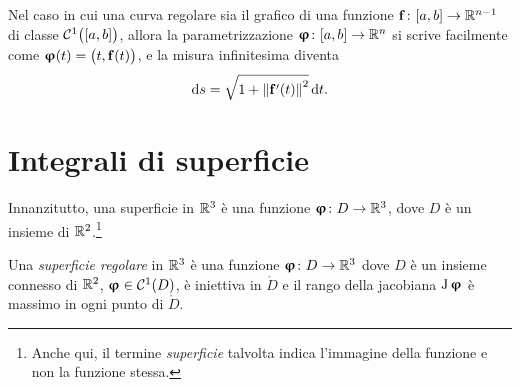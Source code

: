 Nel caso in cui una curva regolare sia il grafico di una funzione $\mathbf{f}\colon[a,b]\to\mathbb{R}^{n-1}$ di classe $\mathcal{C}^{{1}}\big([a,b]\big)$, allora la parametrizzazione $\bm{\upvarphi}\colon[a,b]\to\mathbb{R}^n$ si scrive facilmente come $\bm{\upvarphi}(t)=\big(t,\mathbf{f}(t)\big)$, e la misura infinitesima diventa
\begin{equation}
	\textup{d} s=\sqrt{1+\left\|{\mathbf{f}'(t)}\right\|^2}\,\textup{d} t.
\end{equation}

\section{Integrali di superficie}
Innanzitutto, una superficie in $\mathbb{R}^3$ è una funzione $\bm{\upvarphi}\colon D\to\mathbb{R}^3$, dove $D$ è un insieme di $\mathbb{R}^2$.\footnote{Anche qui, il termine \emph{superficie} talvolta indica l'immagine della funzione e non la funzione stessa.}
\begin{definizione} \label{d:superficie-regolare}
	Una \emph{superficie regolare} in $\mathbb{R}^3$ è una funzione $\bm{\upvarphi}\colon D\to\mathbb{R}^3$ dove $D$ è un insieme connesso di $\mathbb{R}^2$, $\bm{\upvarphi}\in\mathcal{C}^{{1}}(D)$, è iniettiva in $\mathring{D}$ e il rango della jacobiana $\operatorname{J}\bm{\upvarphi}$ è massimo in ogni punto di $\mathring{D}$.
\end{definizione}

